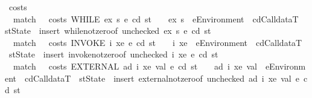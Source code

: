 \begin{isabellebody}
\isamarkupfalse%
\ costs\ {\isacharequal}{\kern0pt}\isanewline
\ \ match\ \ \ {\isachardoublequoteopen}costs\ {\isacharparenleft}{\kern0pt}WHILE\ ex\ s{}{\isacharparenright}{\kern0pt}\ e\ cd\ st\ {\isacharless}{\kern0pt}\ {\isacharunderscore}{\kern0pt}{\isachardoublequoteclose}\ \ ex\ s{}\ \ e{\isacharcolon}{\kern0pt}{\isacharcolon}{\kern0pt}Environment\ \ cd{\isacharcolon}{\kern0pt}{\isacharcolon}{\kern0pt}CalldataT\ \ st{\isacharcolon}{\kern0pt}{\isacharcolon}{\kern0pt}State\ {\isasymRightarrow}\ {\isacartoucheopen}insert\ while{\isacharunderscore}{\kern0pt}not{\isacharunderscore}{\kern0pt}zero{\isacharbrackleft}{\kern0pt}of\ {\isacharparenleft}{\kern0pt}unchecked{\isacharparenright}{\kern0pt}\ ex\ s{}\ e\ cd\ st{\isacharbrackright}{\kern0pt}{\isacartoucheclose}\ {\isacharbar}{\kern0pt}\isanewline
\ \ match\ \ \ {\isachardoublequoteopen}costs\ {\isacharparenleft}{\kern0pt}INVOKE\ i\ xe{\isacharparenright}{\kern0pt}\ e\ cd\ st\ {\isacharless}{\kern0pt}\ {\isacharunderscore}{\kern0pt}{\isachardoublequoteclose}\ \ i\ xe\ \ e{\isacharcolon}{\kern0pt}{\isacharcolon}{\kern0pt}Environment\ \ cd{\isacharcolon}{\kern0pt}{\isacharcolon}{\kern0pt}CalldataT\ \ st{\isacharcolon}{\kern0pt}{\isacharcolon}{\kern0pt}State\ {\isasymRightarrow}\ {\isacartoucheopen}insert\ invoke{\isacharunderscore}{\kern0pt}not{\isacharunderscore}{\kern0pt}zero{\isacharbrackleft}{\kern0pt}of\ {\isacharparenleft}{\kern0pt}unchecked{\isacharparenright}{\kern0pt}\ i\ xe\ e\ cd\ st{\isacharbrackright}{\kern0pt}{\isacartoucheclose}\ {\isacharbar}{\kern0pt}\isanewline
\ \ match\ \ \ {\isachardoublequoteopen}costs\ {\isacharparenleft}{\kern0pt}EXTERNAL\ ad\ i\ xe\ val{\isacharparenright}{\kern0pt}\ e\ cd\ st\ {\isacharless}{\kern0pt}\ {\isacharunderscore}{\kern0pt}{\isachardoublequoteclose}\ \ ad\ i\ xe\ val\ \ e{\isacharcolon}{\kern0pt}{\isacharcolon}{\kern0pt}Environment\ \ cd{\isacharcolon}{\kern0pt}{\isacharcolon}{\kern0pt}CalldataT\ \ st{\isacharcolon}{\kern0pt}{\isacharcolon}{\kern0pt}State\ {\isasymRightarrow}\ {\isacartoucheopen}insert\ external{\isacharunderscore}{\kern0pt}not{\isacharunderscore}{\kern0pt}zero{\isacharbrackleft}{\kern0pt}of\ {\isacharparenleft}{\kern0pt}unchecked{\isacharparenright}{\kern0pt}\ ad\ i\ xe\ val\ e\ cd\ st{\isacharbrackright}{\kern0pt}{\isacartoucheclose}\ {\isacharbar}{\kern0pt}\isanewline

\end{isabellebody}
